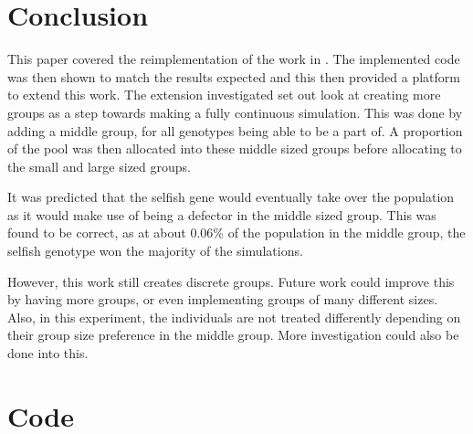 \documentclass[11pt]{ecsarticle}
\begin{document}
\section{Conclusion}\label{sc:conclusion}

This paper covered the reimplementation of the work in \cite{powers2007individual}. 
The implemented code was then shown to match the results expected and this then provided a platform to extend this work. 
The extension investigated set out look at creating more groups as a step towards making a fully continuous simulation.
This was done by adding a middle group, for all genotypes being able to be a part of. 
A proportion of the pool was then allocated into these middle sized groups before allocating to the small and large sized groups.

It was predicted that the selfish gene would eventually take over the population as it would make use of being a defector in the middle sized group. 
This was found to be correct, as at about 0.06\% of the population in the middle group, the selfish genotype won the majority of the simulations.

However, this work still creates discrete groups. 
Future work could improve this by having more groups, or even implementing groups of many different sizes.
Also, in this experiment, the individuals are not treated differently depending on their group size preference in the middle group.
More investigation could also be done into this.

\backmatter



 \appendix
 \clearpage

 \section{Code}\label{ap:code}
\end{document}
